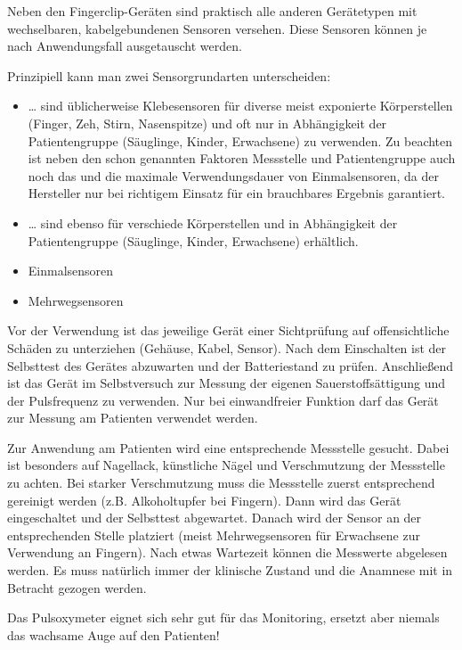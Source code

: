 {%
Neben den Fingerclip-Geräten sind praktisch alle anderen
Gerätetypen mit wechselbaren, kabelgebundenen Sensoren
versehen. Diese Sensoren können je nach Anwendungsfall
ausgetauscht werden.

Prinzipiell kann man zwei Sensorgrundarten unterscheiden:
\begin{itemize}
  \item {} \ldots{} sind üblicherweise
  Klebesensoren für diverse meist exponierte Körperstellen
  (Finger, Zeh, Stirn, Nasenspitze) und oft nur in
  Abhängigkeit der Patientengruppe (Säuglinge, Kinder,
  Erwachsene) zu verwenden. Zu beachten ist neben den schon
  genannten Faktoren Messstelle und Patientengruppe auch
  noch das  und die maximale Verwendungsdauer
  von Einmalsensoren, da der Hersteller nur bei richtigem
  Einsatz für ein brauchbares Ergebnis garantiert.
  \item {} \ldots{} sind ebenso für
  verschiede Körperstellen und in Abhängigkeit der
  Patientengruppe (Säuglinge, Kinder, Erwachsene)
  erhältlich.
\end{itemize}
}{
\begin{itemize}
  \item Einmalsensoren
  \item Mehrwegsensoren
\end{itemize}
}{}{}{}

{%
Vor der Verwendung ist das jeweilige Gerät einer
Sichtprüfung auf offensichtliche Schäden zu unterziehen
(Gehäuse, Kabel, Sensor). Nach dem Einschalten ist der
Selbsttest des Gerätes abzuwarten und der Batteriestand zu
prüfen. Anschließend ist das Gerät im Selbstversuch zur
Messung der eigenen Sauerstoffsättigung und der Pulsfrequenz
zu verwenden. Nur bei einwandfreier Funktion darf das
Gerät zur Messung am Patienten verwendet werden.
}{}{}{}{}

{%
Zur Anwendung am Patienten wird eine entsprechende
Messstelle gesucht. Dabei ist besonders auf Nagellack,
künstliche Nägel und Verschmutzung der Messstelle zu achten.
Bei starker Verschmutzung muss die Messstelle zuerst
entsprechend gereinigt werden (z.B. Alkoholtupfer bei
Fingern). Dann wird das Gerät eingeschaltet und der
Selbsttest abgewartet. Danach wird der Sensor an der
entsprechenden Stelle platziert (meist Mehrwegsensoren für
Erwachsene zur Verwendung an Fingern).
Nach etwas Wartezeit können die Messwerte abgelesen werden.
Es muss natürlich immer der klinische Zustand und die
Anamnese mit in Betracht gezogen werden.

Das Pulsoxymeter eignet sich sehr gut für das Monitoring,
ersetzt aber niemals das wachsame Auge auf den Patienten!
}{}{}{}{}

